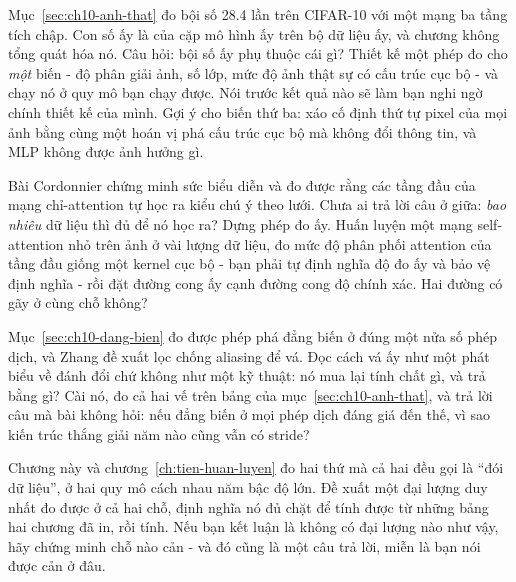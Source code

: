 \tierextend

\begin{bt}
  \item Mục~\ref{sec:ch10-anh-that} đo bội số 28.4 lần trên CIFAR-10 với một
    mạng ba tầng tích chập. Con số ấy là của cặp mô hình ấy trên bộ dữ liệu ấy,
    và chương không tổng quát hóa nó. Câu hỏi: bội số ấy phụ thuộc cái gì? Thiết
    kế một phép đo cho \emph{một} biến - độ phân giải ảnh, số lớp, mức độ ảnh
    thật sự có cấu trúc cục bộ - và chạy nó ở quy mô bạn chạy được. Nói trước
    kết quả nào sẽ làm bạn nghi ngờ chính thiết kế của mình. Gợi ý cho biến thứ
    ba: xáo cố định thứ tự pixel của mọi ảnh bằng cùng một hoán vị phá cấu trúc
    cục bộ mà không đổi thông tin, và MLP không được ảnh hưởng gì.

  \item Bài Cordonnier chứng minh sức biểu diễn và đo được rằng các tầng đầu của
    mạng chỉ-attention tự học ra kiểu chú ý theo lưới. Chưa ai trả lời câu ở
    giữa: \emph{bao nhiêu} dữ liệu thì đủ để nó học ra? Dựng phép đo ấy. Huấn
    luyện một mạng self-attention nhỏ trên ảnh ở vài lượng dữ liệu, đo mức độ
    phân phối attention của tầng đầu giống một kernel cục bộ - bạn phải tự định
    nghĩa độ đo ấy và bảo vệ định nghĩa - rồi đặt đường cong ấy cạnh đường cong
    độ chính xác. Hai đường có gãy ở cùng chỗ không?

  \item Mục~\ref{sec:ch10-dang-bien} đo được phép  phá
    đẳng biến ở đúng một nửa số phép dịch, và Zhang đề xuất lọc chống aliasing
    để vá. Đọc cách vá
    ấy như một phát biểu về đánh đổi chứ không như một kỹ thuật: nó mua lại tính
    chất gì, và trả bằng gì? Cài nó, đo cả hai vế trên bảng của
    mục~\ref{sec:ch10-anh-that}, và trả lời câu mà bài không hỏi: nếu đẳng biến
    ở mọi phép dịch đáng giá đến thế, vì sao kiến trúc thắng giải năm nào cũng
    vẫn có stride?

  \item Chương này và chương~\ref{ch:tien-huan-luyen} đo hai thứ mà cả hai đều
    gọi là \enquote{đói dữ liệu}, ở hai quy mô cách nhau năm bậc độ lớn. Đề xuất
    một đại lượng duy nhất đo được ở cả hai chỗ, định nghĩa nó đủ chặt để tính
    được từ những bảng hai chương đã in, rồi tính. Nếu bạn kết luận là không có
    đại lượng nào như vậy, hãy chứng minh chỗ nào cản - và đó cũng là một câu
    trả lời, miễn là bạn nói được cản ở đâu.
\end{bt}
